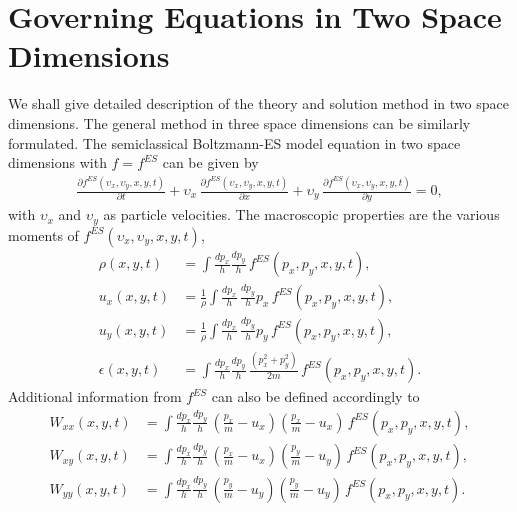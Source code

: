 \documentclass{rsproca}%
\begin{document}
\section{Governing Equations in Two Space Dimensions}
\label{sec:3 1}
We shall give detailed description of the theory and solution method in two space dimensions.   The general method in three space dimensions can be similarly
formulated.   The semiclassical Boltzmann-ES model equation in two space dimensions with $f=f^{ES}$ can be given by
\begin{align}
\frac{\partial f^{ES}({\upsilon}_x,{\upsilon}_y, x, y, t)}{\partial t} + {\upsilon}_x\,\frac{\partial f^{ES}({\upsilon}_x,{\upsilon}_y, x, y, t)}{\partial x } + {\upsilon}_y\,\frac{\partial f^{ES}({\upsilon}_x,{\upsilon}_y, x, y, t)} {\partial y} =0, \label{normalizedes}
\end{align}
with ${\upsilon}_x$ and ${\upsilon}_y$ as particle velocities.   The macroscopic properties are the various moments of $f^{ES}({\upsilon}_x,{\upsilon}_y,x,y,t)$,
\begin{subequations} 
\begin{align}
\rho (x,y,t) 			&= \int \frac{ d p_x}{h} \frac{ d p_y}{h} \, f^{ES}(p_x, p_y, x, y, t), \\
u_x (x,y,t) 			&= \frac{1}{\rho} \int 	 \frac{ d p_x}{h} \, \frac{ d p_y}{h}  p_x \, f^{ES}(p_x, p_y, x, y, t), \\
u_y (x,y,t) 			&= \frac{1}{\rho} \int 	 \frac{ d p_x}{h} \, \frac{ d p_y}{h}  p_y \, f^{ES}(p_x, p_y, x, y, t), \\
\epsilon (x,y,t) 	&= \int \frac{ d p_x}{h} \frac{ d p_y}{h} \, \frac{(p_x^2 + p_y^2)}{2m} \, f^{ES}(p_x, p_y, x, y, t).
\end{align}
\end{subequations}
Additional information from $f^{ES}$ can also be defined accordingly to
\begin{subequations}
\begin{align}
W_{x x}(x,y,t)	&=	\int \frac{ d p_x}{h} \frac{ d p_y}{h} \, (\frac{p_x}{m}-u_x)(\frac{p_x}{m}-u_x)\,f^{ES}(p_x, p_y, x, y, t), \\
W_{x y}(x,y,t)	&=	\int \frac{ d p_x}{h} \frac{ d p_y}{h} \, (\frac{p_x}{m}-u_x)(\frac{p_y}{m}-u_y)\,f^{ES}(p_x, p_y, x, y, t), \\
W_{y y}(x,y,t)	&=	\int \frac{ d p_x}{h} \frac{ d p_y}{h} \, (\frac{p_y}{m}-u_y)(\frac{p_y}{m}-u_y)\,f^{ES}(p_x, p_y, x, y, t). 
\end{align}
\end{subequations}
\end{document}
